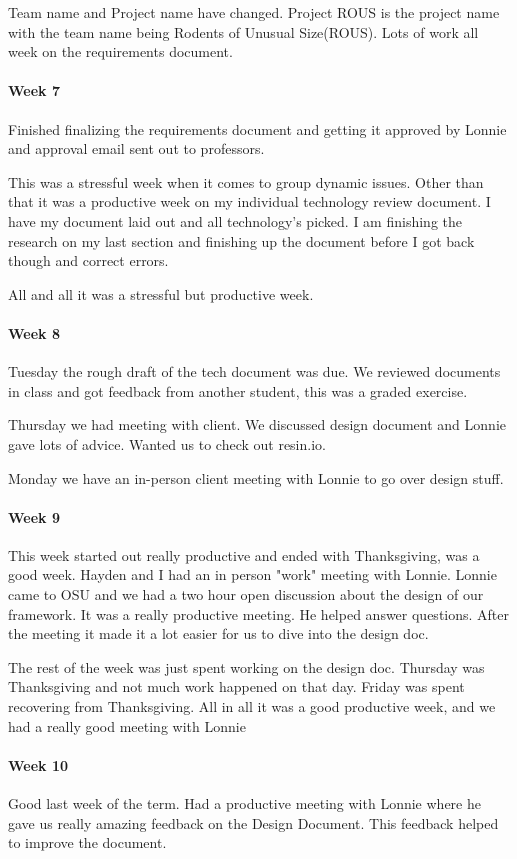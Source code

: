 \documentclass[draftclsnofoot, onecolumn, compsoc, 10pt]{IEEEtran}
\begin{document}
Team name and Project name have changed. Project ROUS is the project name with the team name being Rodents of Unusual Size(ROUS). Lots of work all week on the requirements document. 
\paragraph{Week 7}
Finished finalizing the requirements document and getting it approved by Lonnie and approval email sent out to professors. 

This was a stressful week when it comes to group dynamic issues. Other than that it was a productive week on my individual technology review document. I have my document laid out and all technology's picked. I am finishing the research on my last section and finishing up the document before I got back though and correct errors. 

All and all it was a stressful but productive week. 
\paragraph{Week 8}
Tuesday the rough draft of the tech document was due. We reviewed documents in class and got feedback from another student, this was a graded exercise.  

Thursday we had meeting with client. We discussed design document and Lonnie gave lots of advice. Wanted us to check out resin.io. 

Monday we have an in-person client meeting with Lonnie to go over design stuff. 
\paragraph{Week 9}
This week started out really productive and ended with Thanksgiving, was a good week. Hayden and I had an in person "work" meeting with Lonnie. Lonnie came to OSU and we had a two hour open discussion about the design of our framework. It was a really productive meeting. He helped answer questions. After the meeting it made it a lot easier for us to dive into the design doc. 

The rest of the week was just spent working on the design doc. Thursday was Thanksgiving and not much work happened on that day. Friday was spent recovering from Thanksgiving. All in all it was a good productive week, and we had a really good meeting with Lonnie
\paragraph{Week 10}
Good last week of the term. Had a productive meeting with Lonnie where he gave us really amazing feedback on the Design Document. This feedback helped to improve the document.  
\end{document}
